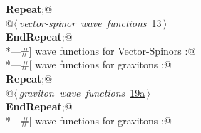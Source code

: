 \documentclass[a4paper,12pt]{amsart}
\renewcommand{\NWlink}[2]{\hyperlink{#1}{#2}}
\renewcommand{\NWsep}{${\diamond}$}
\begin{document}
\begin{flushleft}
\begin{list}{}{}
\mbox{}\verb@@\hbox{\sffamily\bfseries Repeat}\verb@;@\\
\mbox{}\verb@   @\hbox{$\langle\,${\itshape vector-spinor wave functions}\nobreak\ {\footnotesize \NWlink{nuweb13}{13}}$\,\rangle$}\verb@@\\
\mbox{}\verb@@\hbox{\sffamily\bfseries EndRepeat}\verb@;@\\
\mbox{}\verb@*---#] wave functions for Vector-Spinors :@\\
\mbox{}\verb@*---#[ wave functions for gravitons :@\\
\mbox{}\verb@@\hbox{\sffamily\bfseries Repeat}\verb@;@\\
\mbox{}\verb@   @\hbox{$\langle\,${\itshape graviton wave functions}\nobreak\ {\footnotesize \NWlink{nuweb19a}{19a}}$\,\rangle$}\verb@@\\
\mbox{}\verb@@\hbox{\sffamily\bfseries EndRepeat}\verb@;@\\
\mbox{}\verb@*---#] wave functions for gravitons :@\\
\mbox{}\verb@@{\NWsep}
\end{list}
\vspace{-1.5ex}
\footnotesize
\begin{list}{}{\setlength{\itemsep}{-\parsep}\setlength{\itemindent}{-\leftmargin}}

\item{}
\end{list}
\vspace{4ex}
\end{flushleft}
\end{document}
